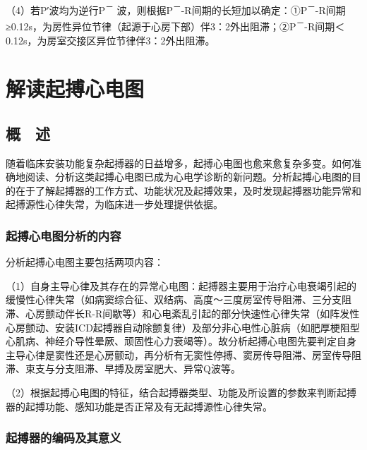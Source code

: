（4）若P′波均为逆行P\textsuperscript{－} 波，则根据P\textsuperscript{－}-R间期的长短加以确定：①P\textsuperscript{－}-R间期≥0.12s，为房性异位节律（起源于心房下部）伴3：2外出阻滞；②P\textsuperscript{－}-R间期＜0.12s，为房室交接区异位节律伴3：2外出阻滞。

\protect\hypertarget{text00045.html}{}{}

\protect\hypertarget{text00045.htmlux5cux23chapter45}{}{}

\chapter{解读起搏心电图}

\protect\hypertarget{text00045.htmlux5cux23subid486}{}{}

\section{概　述}

随着临床安装功能复杂起搏器的日益增多，起搏心电图也愈来愈复杂多变。如何准确地阅读、分析这类起搏心电图已成为心电学诊断的新问题。分析起搏心电图的目的在于了解起搏器的工作方式、功能状况及起搏效果，及时发现起搏器功能异常和起搏源性心律失常，为临床进一步处理提供依据。

\protect\hypertarget{text00045.htmlux5cux23subid487}{}{}

\subsection{起搏心电图分析的内容}

分析起搏心电图主要包括两项内容：

（1）自身主导心律及其存在的异常心电图：起搏器主要用于治疗心电衰竭引起的缓慢性心律失常（如病窦综合征、双结病、高度～三度房室传导阻滞、三分支阻滞、心房颤动伴长R-R间歇等）和心电紊乱引起的部分快速性心律失常（如阵发性心房颤动、安装ICD起搏器自动除颤复律）及部分非心电性心脏病（如肥厚梗阻型心肌病、神经介导性晕厥、顽固性心力衰竭等）。故分析起搏心电图先要判定自身主导心律是窦性还是心房颤动，再分析有无窦性停搏、窦房传导阻滞、房室传导阻滞、束支与分支阻滞、早搏及房室肥大、异常Q波等。

（2）根据起搏心电图的特征，结合起搏器类型、功能及所设置的参数来判断起搏器的起搏功能、感知功能是否正常及有无起搏源性心律失常。

\protect\hypertarget{text00045.htmlux5cux23subid488}{}{}

\subsection{起搏器的编码及其意义}

